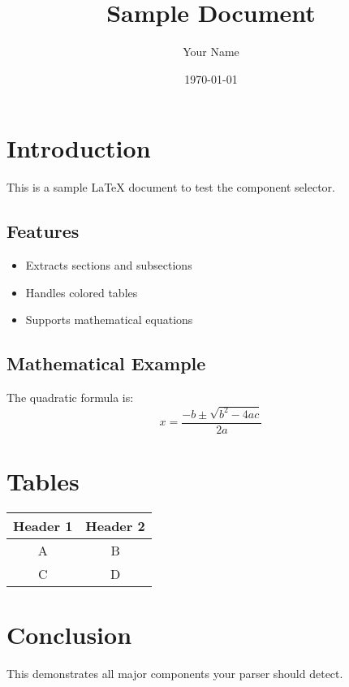 \documentclass{article}
\title{Sample Document}
\author{Your Name}
\date{\today}
\begin{document}
\section{Introduction}
This is a sample LaTeX document to test the component selector.

\subsection{Features}
\begin{itemize}
    \item Extracts sections and subsections
    \item Handles colored tables
    \item Supports mathematical equations
\end{itemize}

\subsection{Mathematical Example}
The quadratic formula is:
\[ x = \frac{-b \pm \sqrt{b^2 - 4ac}}{2a} \]

\section{Tables}
\begin{tabular}{|c|c|}
\hline
\rowcolor{gray!20}
\textbf{Header 1} & \textbf{Header 2} \\
\hline
A & B \\
C & D \\
\hline
\end{tabular}

\section{Conclusion}
This demonstrates all major components your parser should detect.
\end{document}
